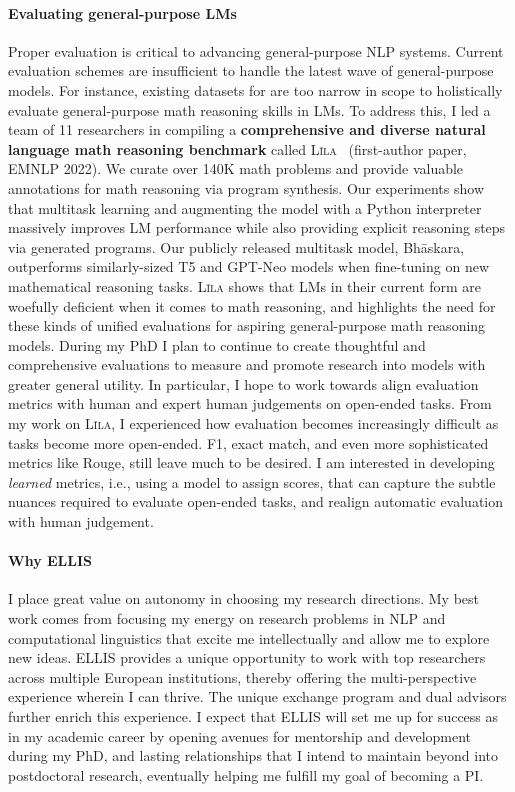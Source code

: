 \documentclass[11pt]{article}
\newcommand\lila{\textsc{L\={\i}la}\xspace}
\newcommand\inst{ELLIS\xspace}
\begin{document}
\paragraph{Evaluating general-purpose LMs}
Proper evaluation is critical to advancing general-purpose NLP systems.
Current evaluation schemes are insufficient to handle
the latest wave of general-purpose models. 
For instance, existing datasets for are too narrow in scope 
to holistically evaluate general-purpose math reasoning skills in LMs.
To address this,
I led a team of 11 researchers in compiling a
\textbf{comprehensive and diverse natural language math reasoning benchmark} 
called \lila~\cite{Mishra2022Lila} (first-author paper, EMNLP 2022).
We curate over 140K math problems
and provide valuable annotations for math reasoning via program synthesis. 
Our experiments show that multitask learning 
and augmenting the model with a Python interpreter
massively improves LM performance 
while also providing explicit reasoning steps via generated programs.
Our publicly released multitask model, Bh\=askara, 
outperforms similarly-sized T5 and GPT-Neo models
when fine-tuning on new mathematical reasoning tasks.
\lila shows that LMs 
in their current form 
are woefully deficient when it comes to math reasoning,
and highlights the need for these kinds of unified evaluations for 
aspiring general-purpose math reasoning models.
During my PhD I plan to continue to create thoughtful and comprehensive evaluations 
to measure and promote research into models with greater general utility.
In particular, I hope to work towards align evaluation metrics
with human and expert human judgements on open-ended tasks. 
From my work on \lila, 
I experienced how evaluation becomes increasingly difficult 
as tasks become more open-ended.
F1, exact match, and even more sophisticated metrics like Rouge,
still leave much to be desired.
I am interested in developing \emph{learned} metrics, 
i.e., using a model to assign scores,
that can capture the subtle nuances required to evaluate open-ended tasks,
and realign automatic evaluation with human judgement.

\paragraph{Why \inst}
I place great value on autonomy in choosing my research directions.
My best work comes from focusing my energy on research problems 
in NLP and computational linguistics 
that excite me intellectually and allow me to explore new ideas.
ELLIS provides a unique opportunity to 
work with top researchers across multiple European institutions,
thereby offering the multi-perspective experience wherein I can thrive.
The unique exchange program and dual advisors 
further enrich this experience.
I expect that ELLIS will set me up for success as in my academic career
by opening avenues for mentorship and development
during my PhD, and lasting relationships 
that I intend to maintain beyond into postdoctoral research,  
eventually helping me fulfill my goal of becoming a PI.



\end{document}
